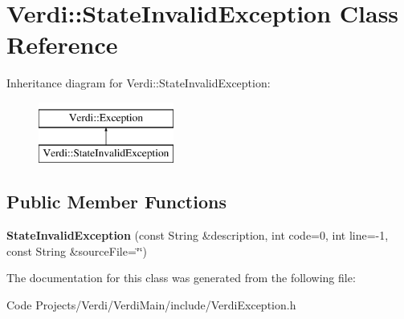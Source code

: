 \hypertarget{class_verdi_1_1_state_invalid_exception}{\section{\-Verdi\-:\-:\-State\-Invalid\-Exception \-Class \-Reference}
\label{class_verdi_1_1_state_invalid_exception}
}
\-Inheritance diagram for \-Verdi\-:\-:\-State\-Invalid\-Exception\-:\begin{figure}[H]
\begin{center}
\leavevmode
\includegraphics[height=2.000000cm]{class_verdi_1_1_state_invalid_exception}
\end{center}
\end{figure}
\subsection*{\-Public \-Member \-Functions}
\begin{DoxyCompactItemize}
\item 
\hypertarget{class_verdi_1_1_state_invalid_exception_addf193341592d82808e8e638e1180ccd}{{\bfseries \-State\-Invalid\-Exception} (const \-String \&description, int code=0, int line=-\/1, const \-String \&source\-File=\char`\"{}\char`\"{})}\label{class_verdi_1_1_state_invalid_exception_addf193341592d82808e8e638e1180ccd}

\end{DoxyCompactItemize}


\-The documentation for this class was generated from the following file\-:\begin{DoxyCompactItemize}
\item 
\-Code Projects/\-Verdi/\-Verdi\-Main/include/\-Verdi\-Exception.\-h\end{DoxyCompactItemize}
